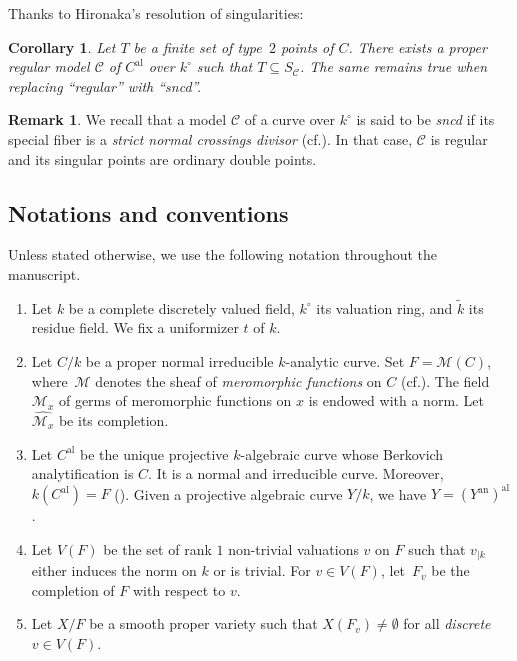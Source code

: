 \documentclass[10pt]{amsart}
\newcommand{\cf}{cf.}
\newcommand{\al}{\mathrm{al}}
\newtheorem{cor}[thm]{Corollary}
\theoremstyle{definition}
\newtheorem{rem}[thm]{Remark}
\begin{document}
Thanks to Hironaka's resolution of singularities:

\begin{cor} \label{lordan1}
Let $T$ be a finite set of type~$2$ points of $C$. There exists a proper regular model $\mathscr{C}$ of $C^{\al}$ over $k^{\circ}$ such that $T \subseteq S_{\mathscr{C}}$. The same remains true when replacing ``regular'' with ``\emph{sncd}''.
\end{cor}

\begin{rem} \label{sncd} We recall that a model $\mathcal{C}$ of a curve over $k^{\circ}$ is said to be \emph{sncd} if its special fiber is a \emph{strict normal crossings divisor} (\cf \cite[Tag\,0BI9]{stacks}). In that case, $\mathcal{C}$ is regular and its singular points are ordinary double points.
\end{rem}

\subsection{Notations and conventions} \label{1.1}

Unless stated otherwise, we use the following notation throughout the manuscript.

\begin{enumerate}
\item Let $k$ be a complete discretely valued field, $k^{\circ}$ its valuation ring, and $\widetilde{k}$ its residue field. We fix a uniformizer $t$ of $k$.

\item Let $C/k$ be a proper normal irreducible $k$-analytic curve. Set $F=\mathscr{M}(C)$, where~$\mathscr{M}$ denotes the sheaf of \emph{meromorphic functions} on $C$ (\cf \cite[1.7]{doktoratura}). The field~$\mathscr{M}_x$ of germs of meromorphic functions on $x$ is endowed with a norm. Let~$\widehat{\mathscr{M}_x}$ be its completion.

\item Let $C^{\al}$ be the unique projective $k$-algebraic curve whose Berkovich analytification is $C$. It is a normal and irreducible curve. Moreover, $k(C^{\al})=F$ (\cite[Prop.\,3.6.2]{Ber90}). Given a projective algebraic curve $Y/k$, we have $Y=(Y^{\mathrm{an}})^{\al}$.

\item Let $V(F)$ be the set of rank $1$ non-trivial valuations $v$ on $F$ such that $v_{|k}$ either induces the norm on $k$ or is trivial. For $v \in V(F)$, let~$F_v$ be the completion of $F$ with respect to $v$.

\item Let $X/F$ be a smooth proper variety such that $X(F_v) \neq \emptyset$ for all \emph{discrete} $v \in V(F)$.
\end{enumerate}
\end{document}
